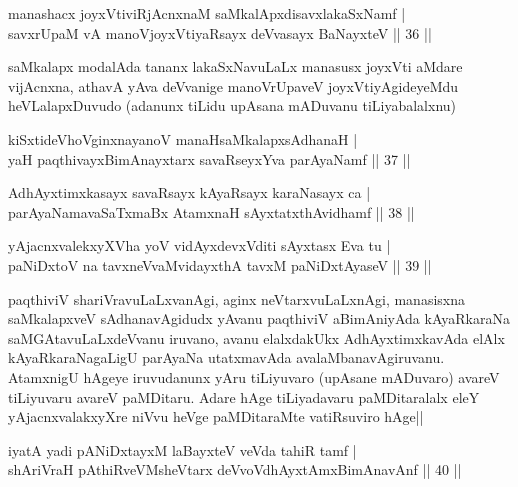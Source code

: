 
\begin{shl}
manashacx joyxVtiviRjAcnxnaM saMkalApxdisavxlakaSxNamf |\\
savxrUpaM vA manoVjoyxVtiyaRsayx deVvasayx BaNayxteV \hfill || 36 ||
\end{shl}

\begin{artha}
saMkalapx modalAda tananx lakaSxNavuLaLx manasusx joyxVti aMdare vijAcnxna, athavA yAva deVvanige manoVrUpaveV joyxVtiyAgideyeMdu heVLalapxDuvudo (adanunx tiLidu upAsana mADuvanu tiLiyabalalxnu)
\end{artha}


\begin{shl}
kiSxtideVhoV\s ginxnayanoV manaHsaMkalapxsAdhanaH |\\
yaH paqthivayxBimAnayxtarx savaRseyxYva parAyaNamf \hfill || 37 ||
\end{shl}

\begin{shl}
AdhAyxtimxkasayx savaRsayx kAyaRsayx karaNasayx ca |\\
parAyaNamavaSaTxmaBx AtamxnaH sAyxtatxthAvidhamf \hfill || 38 ||
\end{shl}

\begin{shl}
yAjacnxvalekxyXVha yoV vidAyxdevxVditi sAyxtasx Eva tu |\\
paNiDxtoV na tavxneVvaMvidayxthA tavxM paNiDxtAyaseV \hfill || 39 ||
\end{shl}

\begin{artha}
paqthiviV shariVravuLaLxvanAgi, aginx neVtarxvuLaLxnAgi, manasisxna saMkalapxveV sAdhanavAgidudx yAvanu paqthiviV aBimAniyAda kAyaRkaraNa saMGAtavuLaLxdeVvanu iruvano, avanu elalxdakUkx AdhAyxtimxkavAda elAlx kAyaRkaraNagaLigU parAyaNa utatxmavAda avalaMbanavAgiruvanu. AtamxnigU hAgeye iruvudanunx yAru tiLiyuvaro (upAsane mADuvaro) avareV tiLiyuvaru avareV paMDitaru. Adare hAge tiLiyadavaru paMDitaralalx eleY yAjacnxvalakxyXre niVvu heVge paMDitaraMte vatiRsuviro hAge||
\end{artha}


\begin{shl}
iyatA yadi pANiDxtayxM laBayxteV veVda tahiR tamf |\\
shAriVraH pAthiRveVM\s sheV\s tarx deVvoV\s dhAyxtAmxBimAnavAnf \hfill || 40 ||
\end{shl}

